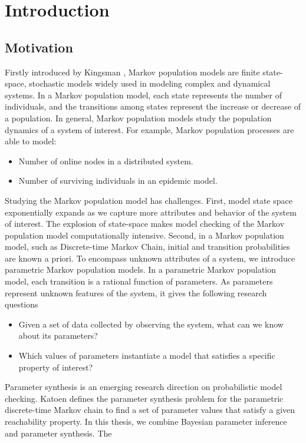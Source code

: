 \chapter{Introduction}
\section{Motivation}
Firstly introduced by Kingsman \cite{kingman1969markov}, Markov population models  are finite
state-space, stochastic models widely used in modeling complex and dynamical systems. In a Markov
population model, each state represents the number of individuals, and the transitions among states
represent the increase or decrease of a population. In general, Markov population models study the
population dynamics of a system of interest. For example, Markov population processes are able to
model:
\begin{itemize}
      \item Number of online nodes in a distributed system.
      \item Number of surviving individuals in an epidemic model.
\end{itemize}
Studying the Markov population model has challenges. First, model state space exponentially expands
as we capture more attributes and behavior of the system of interest. The explosion of state-space
makes model checking of the Markov population model computationally intensive. Second, in a Markov
population model, such as Discrete-time Markov Chain, initial and transition probabilities are known
a priori. To encompass unknown attributes of a system, we introduce parametric Markov population
models. In a parametric Markov population model, each transition is a rational function of
parameters. As parameters represent unknown features of the system, it gives the following research
questions
\begin{itemize}
      \item Given a set of data collected by observing the system, what can we know about its
            parameters?
      \item Which values of parameters instantiate a model that satisfies a specific property of
            interest?
\end{itemize}
Parameter synthesis is an emerging research direction on probabilistic model checking. Katoen
\cite{katoen2016probabilistic} defines the parameter synthesis problem for the parametric
discrete-time Markov chain to find a set of parameter values that satisfy a given reachability
property. In this thesis, we combine Bayesian parameter inference and parameter synthesis. The
